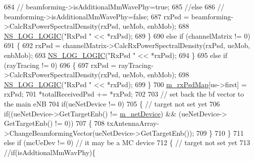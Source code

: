 \begin{DoxyCode}
684                         \textcolor{comment}{//      beamforming->isAdditionalMmWavePhy=true;}
685                         \textcolor{comment}{//else}
686                         \textcolor{comment}{//      beamforming->isAdditionalMmWavePhy=false;}
687                         rxPsd = beamforming->CalcRxPowerSpectralDensity(rxPsd, ueMob, enbMob);
688                         \hyperlink{group__logging_ga88acd260151caf2db9c0fc84997f45ce}{NS\_LOG\_LOGIC}(\textcolor{stringliteral}{"RxPsd "} << *rxPsd);
689                 \}
690                 \textcolor{keywordflow}{else} \textcolor{keywordflow}{if} (channelMatrix != 0)
691                 \{
692                         rxPsd = channelMatrix->CalcRxPowerSpectralDensity(rxPsd, ueMob, enbMob);
693                         \hyperlink{group__logging_ga88acd260151caf2db9c0fc84997f45ce}{NS\_LOG\_LOGIC}(\textcolor{stringliteral}{"RxPsd "} << *rxPsd);
694                 \}
695                 \textcolor{keywordflow}{else} \textcolor{keywordflow}{if} (rayTracing != 0)
696                 \{
697                         rxPsd = rayTracing->CalcRxPowerSpectralDensity(rxPsd, ueMob, enbMob);
698                         \hyperlink{group__logging_ga88acd260151caf2db9c0fc84997f45ce}{NS\_LOG\_LOGIC}(\textcolor{stringliteral}{"RxPsd "} << *rxPsd);
699                 \}
700                 \hyperlink{classns3_1_1MmWaveEnbPhy_a40b3813d00f430aed47e1ee084df4d78}{m\_rxPsdMap}[ue->first] = rxPsd;
701                 *totalReceivedPsd += *rxPsd;
702 
703                 \textcolor{comment}{// set back the bf vector to the main eNB}
704                 \textcolor{keywordflow}{if}(ueNetDevice != 0) 
705                 \{                                                                                                               \textcolor{comment}{
      // target not set yet}
706                         \textcolor{keywordflow}{if}((ueNetDevice->GetTargetEnb() != \hyperlink{classns3_1_1MmWavePhy_a0f14f4e8f7539b06497ba321d9df344c}{m\_netDevice}) && (ueNetDevice->
      GetTargetEnb() != 0))
707                         \{
708                                 txAntennaArray->ChangeBeamformingVector(ueNetDevice->GetTargetEnb());
709                         \}
710                 \}
711                 \textcolor{keywordflow}{else} \textcolor{keywordflow}{if} (mcUeDev != 0) \textcolor{comment}{// it may be a MC device}
712                 \{                                                                                                                       \textcolor{comment}{
      // target not set yet}
713                         \textcolor{comment}{//if(isAddtionalMmWavPhy)\{}

\end{DoxyCode}
